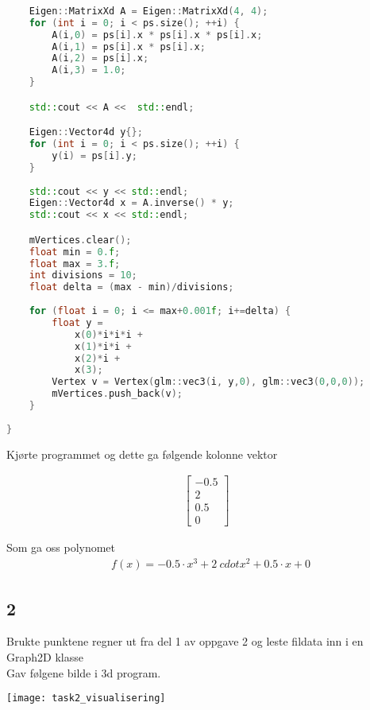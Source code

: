 ﻿\documentclass[14]{article}
\begin{document}
\begin{flushleft}
\begin{lstlisting}[language=C++, caption=Oppgave 2 numerisk utregning]
        
    Eigen::MatrixXd A = Eigen::MatrixXd(4, 4);
    for (int i = 0; i < ps.size(); ++i) {
        A(i,0) = ps[i].x * ps[i].x * ps[i].x;
        A(i,1) = ps[i].x * ps[i].x;
        A(i,2) = ps[i].x;
        A(i,3) = 1.0;
    }

    std::cout << A <<  std::endl;

    Eigen::Vector4d y{};
    for (int i = 0; i < ps.size(); ++i) {
        y(i) = ps[i].y;
    }
        
    std::cout << y << std::endl;
    Eigen::Vector4d x = A.inverse() * y;
    std::cout << x << std::endl;

    mVertices.clear();
    float min = 0.f;
    float max = 3.f;
    int divisions = 10;
    float delta = (max - min)/divisions;
    
    for (float i = 0; i <= max+0.001f; i+=delta) {
        float y =
            x(0)*i*i*i +
            x(1)*i*i +
            x(2)*i +
            x(3);
        Vertex v = Vertex(glm::vec3(i, y,0), glm::vec3(0,0,0));
        mVertices.push_back(v);    
    }
    
}
        \end{lstlisting}
        
        Kjørte programmet og dette ga følgende kolonne vektor
        
        \begin{align*}
            \begin{bmatrix}
                -0.5 \\ 2 \\ 0.5 \\ 0
            \end{bmatrix}
            \end{align*}
        
        Som ga oss polynomet 
        \begin{align*}
            & f(x) = -0.5 \cdot x^3 + 2\ cdot x^2 + 0.5 \cdot x + 0
        \end{align*}

        \subsection*{2}
        
        Brukte punktene regner ut fra del 1 av oppgave 2 og leste fildata inn i en Graph2D klasse\\
        Gav følgene bilde i 3d program.
        
        \texttt{[image: task2\_visualisering]}
        


\end{flushleft}
\end{document}
